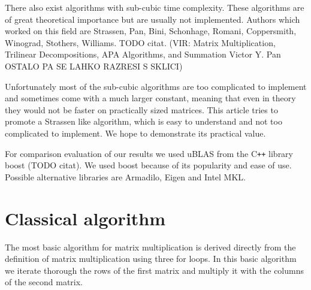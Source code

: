 \documentclass[a4paper,11pt]{article}
\newcommand{\cpp}{C\texttt{++} }
\begin{document}
There also exist algorithms with sub-cubic time complexity. These algorithms are of great theoretical importance but are usually not implemented.
Authors which worked on this field are Strassen, Pan, Bini, Schonhage, Romani, Coppersmith, Winograd, Stothers, Williams. TODO citat.
(VIR: Matrix Multiplication, Trilinear Decompositions,
APA Algorithms, and Summation
Victor Y. Pan
OSTALO PA SE LAHKO RAZRESI S SKLICI)

Unfortunately most of the sub-cubic algorithms are too complicated to implement and sometimes come with a much larger constant, meaning that even in theory they would not be faster on practically sized matrices.
This article tries to promote a Strassen like algorithm, which is easy to understand and not too complicated to implement.
We hope to demonstrate its practical value.


For comparison evaluation of our results we used uBLAS from the \cpp library boost (TODO citat). We used boost because of its popularity and ease of use.
Possible alternative libraries are Armadilo, Eigen and Intel MKL.

\section{Classical algorithm}
The most basic algorithm for matrix multiplication is derived directly from the definition of matrix multiplication using three for loops.
In this basic algorithm we iterate thorough the rows of the first matrix and multiply it with the columns of the second matrix.

\end{document}
